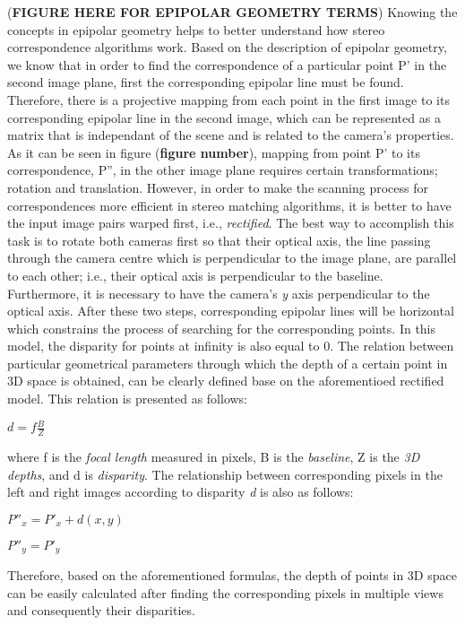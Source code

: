 \documentclass[dvips,letterpaper,12pt]{report}
\begin{document}
(\textbf{FIGURE HERE FOR EPIPOLAR GEOMETRY TERMS}) 
\newline 
Knowing the concepts in epipolar geometry helps to better understand how stereo correspondence algorithms work. Based on the description of epipolar geometry, 
we know that in order to find the correspondence of a particular point P' in the second image plane, first the corresponding epipolar line must be found. 
Therefore, there is a projective mapping from each point in the first image 
to its corresponding epipolar line in the second image, which can be represented as a matrix that is independant of the scene and is related to the camera's properties.\cite{hart2000} As it can be
seen in figure (\textbf{figure number}), mapping from point P' to its correspondence, P'', in the other image plane requires certain transformations; rotation and translation. However, in order
to make the scanning process for correspondences more efficient in stereo matching algorithms, 
it is better to have the input image pairs warped first, i.e., {\it rectified}. The best way to accomplish this task is to
rotate both cameras first so that their optical axis, the line passing through the camera centre which is perpendicular to the image plane, are parallel to each other; 
i.e., their optical axis is perpendicular to the baseline. Furthermore, it is necessary to have the camera's {\it y} axis perpendicular to the optical axis. After these two steps,
corresponding epipolar lines will be horizontal which constrains the process of searching for the corresponding points. 
In this model, the disparity for points at infinity is also equal to 0.\cite{sze11}
The relation between particular geometrical parameters through which the depth of a certain point in 3D space is obtained, can be clearly defined base on the aforementioed rectified model. 
This relation is presented as follows:
\begin{center}
$d = f\frac{B}{Z}$
\end{center}
where f is the {\it focal length} measured in pixels, B is the {\it baseline}, Z is the {\it 3D depths}, and d is {\it disparity}. The relationship between corresponding pixels in the left
and right images according to disparity {\it d} is also as follows:
\begin{center}
${P}''_{x}={P}'_{x}+d(x,y)$

${P}''_{y} = {P}'_{y}$
\end{center}
Therefore, based on the aforementioned formulas, the depth of points in 3D space can be easily calculated after finding the corresponding pixels in multiple views and consequently their
disparities. \cite{bol87,oku93,sch02}
\end{document}
